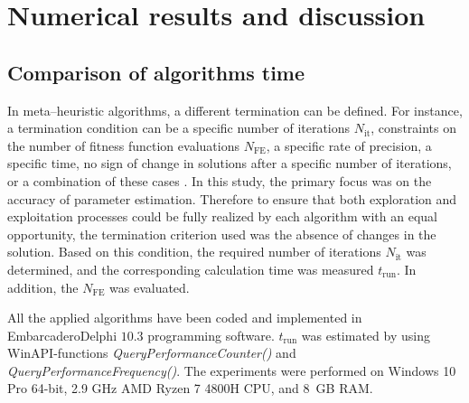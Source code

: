 \documentclass[a4paper,fleqn]{cas-dc}
\begin{document}




\section{Numerical results and discussion}\label{Result}

\subsection{Comparison of algorithms time}
In meta--heuristic algorithms, a different termination can be defined.
For instance, a termination condition can be a specific number of iterations $N_\mathrm{it}$,
constraints on the number of fitness function evaluations $N_\mathrm{FE}$,
a specific rate of precision,
a specific time,
no sign of change in solutions after a specific number of iterations,
or a combination of these cases \cite{IntelligentChaoticClonal}.
In this study, the primary focus was on the accuracy of parameter estimation.
Therefore to ensure that both exploration and exploitation processes could be fully realized
by each algorithm with an equal opportunity, the termination criterion used was the absence of changes in the solution.
Based on this condition, the required number of iterations $N_\mathrm{it}$ was determined,
and the corresponding calculation time was measured $t_\mathrm{run}$.
In addition, the $N_\mathrm{FE}$ was evaluated.

All the applied algorithms have been coded and implemented in Embarcadero\textregistered Delphi $10.3$ programming software.
$t_\mathrm{run}$ was estimated by using WinAPI-functions \emph{QueryPerformanceCounter()} and \emph{QueryPerformanceFrequency()}.
The experiments were performed on Windows 10 Pro 64-bit,
2.9 GHz AMD Ryzen 7 4800H CPU, and 8~GB RAM.

\end{document}
